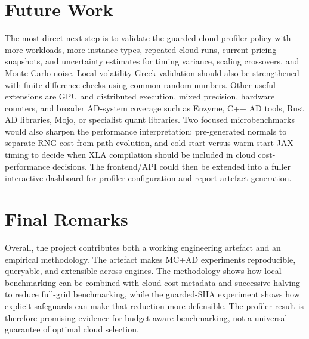 \section{Future Work}

The most direct next step is to validate the guarded cloud-profiler policy with
more workloads, more instance types, repeated cloud runs, current pricing
snapshots, and uncertainty estimates for timing variance, scaling crossovers,
and Monte Carlo noise. Local-volatility Greek validation should also be
strengthened with finite-difference checks using common random numbers. Other
useful extensions are GPU and
distributed execution, mixed precision, hardware counters, and broader AD-system
coverage such as Enzyme, C++ AD tools, Rust AD libraries, Mojo, or specialist
quant libraries. Two focused microbenchmarks would also sharpen the performance
interpretation: pre-generated normals to separate RNG cost from path evolution,
and cold-start versus warm-start JAX timing to decide when XLA compilation should
be included in cloud cost-performance decisions. The frontend/API could then be
extended into a fuller interactive dashboard for profiler configuration and
report-artefact generation.

\section{Final Remarks}

Overall, the project contributes both a working engineering artefact and an
empirical methodology. The artefact makes MC+AD experiments reproducible,
queryable, and extensible across engines. The methodology shows how local
benchmarking can be combined with cloud cost metadata and successive halving to
reduce full-grid benchmarking, while the guarded-SHA experiment shows how
explicit safeguards can make that reduction more defensible. The profiler result
is therefore promising evidence for budget-aware benchmarking, not a universal
guarantee of optimal cloud selection.
